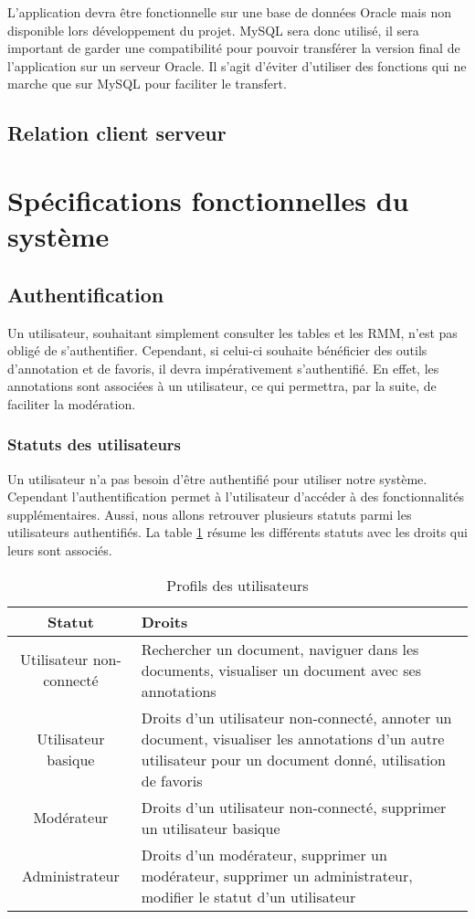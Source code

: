 \documentclass[a4paper]{article}
\begin{document}
L'application devra \^etre fonctionnelle sur une base de données Oracle mais non disponible lors développement du projet. MySQL sera donc utilisé, il sera important de garder une compatibilité pour pouvoir transférer la version final de l'application sur un serveur Oracle. Il s'agit d'éviter d'utiliser des fonctions qui ne marche que sur MySQL pour faciliter le transfert.
\subsection{Relation client serveur}

\section{Spécifications fonctionnelles du système}

\subsection{Authentification}

Un utilisateur, souhaitant simplement consulter les tables et les RMM, n'est pas obligé de s'authentifier. Cependant, si celui-ci souhaite bénéficier des outils d'annotation et de favoris, il devra impérativement s'authentifié. En effet, les annotations sont associées à un utilisateur, ce qui permettra, par la suite, de faciliter la modération.

\subsubsection{Statuts des utilisateurs}

Un utilisateur n'a pas besoin d'être authentifié pour utiliser notre système. Cependant l'authentification permet à l'utilisateur d'accéder à des fonctionnalités supplémentaires. Aussi, nous allons retrouver plusieurs statuts parmi les utilisateurs authentifiés. La table \ref{tab:profils} résume les différents statuts avec les droits qui leurs sont associés. 

\begin{table}[H]
	\centering
		\small
			\begin{tabular}{|c|p{7cm}|}
				\hline
					\rowcolor{lightgray}\textbf{Statut} & \textbf{Droits} \\
				\hline
					Utilisateur non-connecté & Rechercher un document, naviguer dans les documents, visualiser un document avec ses annotations \\
				\hline
					Utilisateur basique & Droits d'un utilisateur non-connecté, annoter un document, visualiser les annotations d'un autre utilisateur pour un document donné, utilisation de favoris \\
				\hline
					Modérateur & Droits d'un utilisateur non-connecté, supprimer un utilisateur basique\\
				\hline
					Administrateur & Droits d'un modérateur, supprimer un modérateur, supprimer un administrateur, modifier le statut d'un utilisateur \\
				\hline
			\end{tabular}
			\caption{Profils des utilisateurs}
		\normalsize
	\label{tab:profils}
\end{table}
\end{document}
